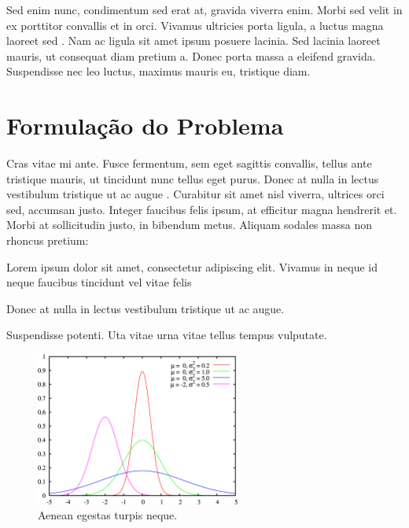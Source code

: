\documentclass[12pt]{article}
\begin{document}
Sed enim nunc, condimentum sed erat at, gravida viverra enim. Morbi sed velit in ex porttitor convallis et in orci. Vivamus ultricies porta ligula, a luctus magna laoreet sed \cite{smith:99}. Nam ac ligula sit amet ipsum posuere lacinia. Sed lacinia laoreet mauris, ut consequat diam pretium a. Donec porta massa a eleifend gravida. Suspendisse nec leo luctus, maximus mauris eu, tristique diam.



\section{Formulação do Problema}

Cras vitae mi ante. Fusce fermentum, sem eget sagittis convallis, tellus ante tristique mauris, ut tincidunt nunc tellus eget purus. Donec at nulla in lectus vestibulum tristique ut ac augue \cite{sedg:11}. Curabitur sit amet nisl viverra, ultrices orci sed, accumsan justo. Integer faucibus felis ipsum, at efficitur magna hendrerit et. Morbi at sollicitudin justo, in bibendum metus. Aliquam sodales massa non rhoncus pretium:

\begin{enumerate}

\begin{item}
Lorem ipsum dolor sit amet, consectetur adipiscing elit. Vivamus in neque id neque faucibus tincidunt vel vitae felis
\end{item}

\begin{item}
Donec at nulla in lectus vestibulum tristique ut ac augue.
\end{item}

\begin{item}
Suspendisse potenti. Uta vitae urna vitae tellus tempus vulputate.
\end{item}

\end{enumerate}

\begin{figure}[h!]
    \begin{center}
    \includegraphics[width=0.60\textwidth]{imagens/gmm.png} 
    \caption{Aenean egestas turpis neque.}
    \end{center}
\end{figure}
\end{document}
